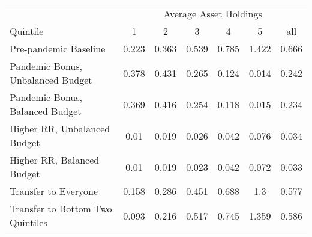 \begin{center}
\begin{adjustbox}{width=\textwidth}
\begin{tabular}{lcccccc}\toprule
 & \multicolumn{6}{c}{Average Asset Holdings} \\
\cline{2-7}
Quintile & 1 & 2 & 3 & 4 & 5 & all \\
\midrule
Pre-pandemic Baseline & 0.223 & 0.363 & 0.539 & 0.785 & 1.422 & 0.666 \\
Pandemic Bonus, Unbalanced Budget & 0.378 & 0.431 & 0.265 & 0.124 & 0.014 & 0.242 \\
Pandemic Bonus, Balanced Budget & 0.369 & 0.416 & 0.254 & 0.118 & 0.015 & 0.234 \\
Higher RR, Unbalanced Budget & 0.01 & 0.019 & 0.026 & 0.042 & 0.076 & 0.034 \\
Higher RR, Balanced Budget & 0.01 & 0.019 & 0.023 & 0.042 & 0.072 & 0.033 \\
Transfer to Everyone & 0.158 & 0.286 & 0.451 & 0.688 & 1.3 & 0.577 \\
Transfer to Bottom Two Quintiles & 0.093 & 0.216 & 0.517 & 0.745 & 1.359 & 0.586 \\
\bottomrule\end{tabular}
\end{adjustbox}
\end{center}